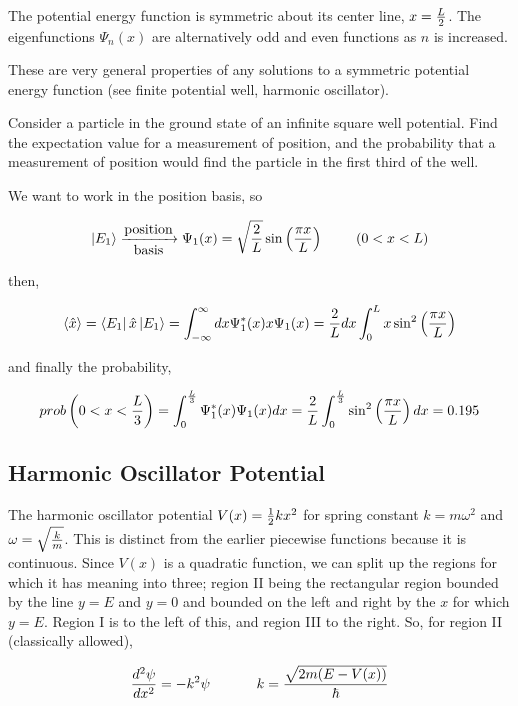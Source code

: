 \documentclass[english, 11pt]{article}
\begin{document}
        The potential energy function is symmetric about its center line, $x = \frac{L}{2}$. The eigenfunctions $\Psi_n(x)$ are alternatively odd and even functions as $n$ is increased.\newline

      These are very general properties of any solutions to a symmetric potential energy function (see finite potential well, harmonic oscillator).

      \begin{exmp}
        Consider a particle in the ground state of an infinite square well potential. Find the expectation value for a measurement of position, and the probability that a measurement of position would find the particle in the first third of the well.
      \end{exmp}

      We want to work in the position basis, so

      \[ \left|E_1\right\rangle \xrightarrow[\mbox{basis}]{\mbox{position}} \Psi_1(x) = \sqrt{\frac{2}{L}}\sin \left( \frac{\pi x}{L} \right) \ \ \ \ \ \ \ (0 < x < L) \]

      then,

      \[ \langle \hat{x} \rangle = \left\langle E_1\right|\hat{x}\left|E_1\right\rangle = \int_{-\infty}^{\infty} dx \Psi_1^*(x)x\Psi_1(x) = \frac{2}{L} dx \int_0^L x\sin^2 \left( \frac{\pi x}{L} \right) \]

      and finally the probability,

      \[ prob\left(0<x<\frac{L}{3}\right) = \int_0^{\frac{L}{3}}\Psi_1^*(x)\Psi_1(x)dx = \frac{2}{L} \int_0^{\frac{L}{3}} \sin^2 \left( \frac{\pi x}{L}\right) dx = 0.195  \]


    \subsection{Harmonic Oscillator Potential}

      The harmonic oscillator potential $V(x) = \frac{1}{2}kx^2$ for spring constant $k = m\omega^2$ and $\omega = \sqrt{\frac{k}{m}}$. This is distinct from the earlier piecewise functions because it is continuous. Since $V(x)$ is a quadratic function, we can split up the regions for which it has meaning into three; region II being the rectangular region bounded by the line $y = E$ and $y = 0$ and bounded on the left and right by the $x$ for which $y = E$. Region I is to the left of this, and region III to the right. So, for region II (classically allowed),

      \[ \f{d^2\psi}{dx^2} = -k^2\psi \ \ \ \ \ \ \ \ \ \ k = \f{\sqrt{2m(E-V(x))}}{\hbar} \]
\end{document}
